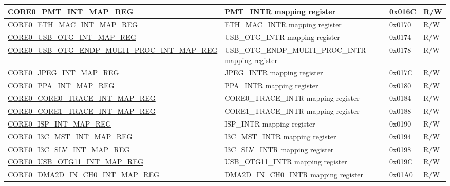 \begin{longtable}{ | p{7.5cm} | p{7.2cm} | p{1.3cm} | p{1cm} | }
\hyperref[regdesc:CORE0PMTINTMAPREG]{CORE0\_PMT\_INT\_MAP\_REG} & PMT\_INTR mapping register & 0x016C & R/W \\ \hline

\hyperref[regdesc:CORE0SBDINTMAPREG]{CORE0\_ETH\_MAC\_INT\_MAP\_REG} & ETH\_MAC\_INTR mapping register & 0x0170 & R/W \\ \hline

\hyperref[regdesc:CORE0USBOTGINTMAPREG]{CORE0\_USB\_OTG\_INT\_MAP\_REG} & USB\_OTG\_INTR mapping register & 0x0174 & R/W \\ \hline

\hyperref[regdesc:CORE0USBOTGENDPMULTIPROCINTMAPREG]{CORE0\_USB\_OTG\_ENDP\_MULTI\_PROC\_INT\_MAP\_REG} & USB\_OTG\_ENDP\_MULTI\_PROC\_INTR mapping register & 0x0178 & R/W \\ \hline

\hyperref[regdesc:CORE0JPEGINTMAPREG]{CORE0\_JPEG\_INT\_MAP\_REG} & JPEG\_INTR mapping register & 0x017C & R/W \\ \hline

\hyperref[regdesc:CORE0PPAINTMAPREG]{CORE0\_PPA\_INT\_MAP\_REG} & PPA\_INTR mapping register & 0x0180 & R/W \\ \hline

\hyperref[regdesc:CORE0CORE0TRACEINTMAPREG]{CORE0\_CORE0\_TRACE\_INT\_MAP\_REG} & CORE0\_TRACE\_INTR mapping register & 0x0184 & R/W \\ \hline

\hyperref[regdesc:CORE0CORE1TRACEINTMAPREG]{CORE0\_CORE1\_TRACE\_INT\_MAP\_REG} & CORE1\_TRACE\_INTR mapping register & 0x0188 & R/W \\ \hline

\hyperref[regdesc:CORE0ISPINTMAPREG]{CORE0\_ISP\_INT\_MAP\_REG} & ISP\_INTR mapping register & 0x0190 & R/W \\ \hline

\hyperref[regdesc:CORE0I3CMSTINTMAPREG]{CORE0\_I3C\_MST\_INT\_MAP\_REG} & I3C\_MST\_INTR mapping register & 0x0194 & R/W \\ \hline

\hyperref[regdesc:CORE0I3CSLVINTMAPREG]{CORE0\_I3C\_SLV\_INT\_MAP\_REG} & I3C\_SLV\_INTR mapping register & 0x0198 & R/W \\ \hline

\hyperref[regdesc:CORE0USBOTG11INTMAPREG]{CORE0\_USB\_OTG11\_INT\_MAP\_REG} & USB\_OTG11\_INTR mapping register & 0x019C & R/W \\ \hline

\hyperref[regdesc:CORE0DMA2DINCH0INTMAPREG]{CORE0\_DMA2D\_IN\_CH0\_INT\_MAP\_REG} & DMA2D\_IN\_CH0\_INTR mapping register & 0x01A0 & R/W \\ \hline


\end{longtable}
